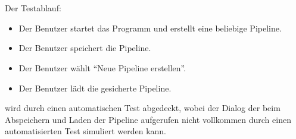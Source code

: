 \paragraph{}

\paragraph{}

\paragraph{} ~\\

Der Testablauf:

\begin{itemize}
	\item Der Benutzer startet das Programm und erstellt eine beliebige Pipeline.
	\item Der Benutzer speichert die Pipeline.
	\item Der Benutzer wählt ``Neue Pipeline erstellen''.
	\item Der Benutzer lädt die gesicherte Pipeline.
\end{itemize}

wird durch einen automatischen Test abgedeckt, wobei der Dialog der beim Abspeichern und Laden der Pipeline aufgerufen nicht vollkommen durch einen automatisierten Test simuliert werden kann.

\paragraph{}

\paragraph{}
